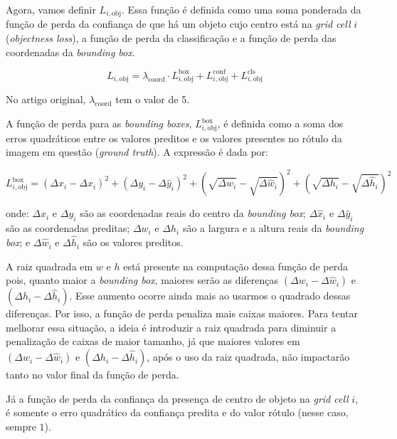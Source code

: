 Agora, vamos definir $L_{i, \text{obj}}$. Essa função é definida como uma soma ponderada da função de perda da confiança de que há um objeto cujo centro está na \emph{grid cell} $i$ (\emph{objectness loss}), a função de perda da classificação e a função de perda das coordenadas da \emph{bounding box}.
\begin{center}
\[
L_{i, \text{obj}} = \lambda_{\text{coord}} \cdot L_{i, \text{obj}}^{\text{box}} + L_{i, \text{obj}}^{\text{conf}} + L_{i, \text{obj}}^{\text{cls}}
\]
\end{center}

No artigo original, $\lambda_{\text{coord}}$ tem o valor de 5.

A função de perda para as \emph{bounding boxes}, \( L_{i, \text{obj}}^{\text{box}} \), é definida como a soma dos erros quadráticos entre os valores preditos e os valores presentes no rótulo da imagem em questão (\emph{ground truth}). A expressão é dada por:

\[
L_{i, \text{obj}}^{\text{box}} = (\Delta x_i - \Delta \hat{x}_i)^2 + (\Delta y_i - \Delta \hat{y}_i)^2 + \left(\sqrt{\Delta w_i} - \sqrt{\Delta \hat{w}_i}\right)^2 + \left(\sqrt{\Delta h_i} - \sqrt{\Delta \hat{h}_i}\right)^2
\]

onde: \( \Delta x_i \) e \( \Delta y_i \) são as coordenadas reais do centro da \emph{bounding box};  \( \Delta \hat{x}_i \) e \( \Delta \hat{y}_i \) são as coordenadas preditas; \( \Delta w_i \) e \( \Delta h_i \) são a largura e a altura reais da \emph{bounding box}; e \( \Delta \hat{w}_i \) e \( \Delta \hat{h}_i \) são os valores preditos.

A raiz quadrada em \( w \) e \( h \) está presente na computação dessa função de perda pois, quanto maior a \emph{bounding box}, maiores serão as diferenças $\left(\Delta w_i - \Delta \hat{w}_i \right)$ e $ \left( \Delta h_i - \Delta \hat{h}_i \right)$. Esse aumento ocorre ainda mais ao usarmos o quadrado dessas diferenças. Por isso, a função de perda penaliza mais caixas maiores. Para tentar melhorar essa situação, a ideia é introduzir a raiz quadrada para diminuir a penalização de caixas de maior tamanho, já que maiores valores em $\left(\Delta w_i - \Delta \hat{w}_i \right)$ e $ \left( \Delta h_i - \Delta \hat{h}_i \right)$, após o uso da raiz quadrada, não impactarão tanto no valor final da função de perda.

Já a função de perda da confiança da presença de centro de objeto na \emph{grid cell} $i$, é somente o erro quadrático da confiança predita e do valor rótulo (nesse caso, sempre $1$).

